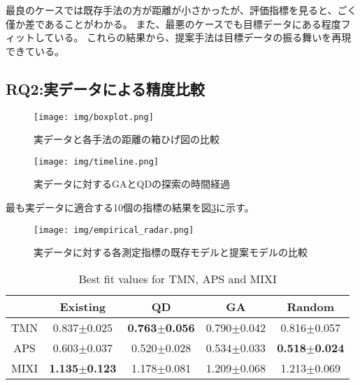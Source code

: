 \documentclass[uplatex,11pt,openany]{ujreport}
\begin{document}
            最良のケースでは既存手法の方が距離が小さかったが、評価指標を見ると、ごく僅か差であることがわかる。
            また、最悪のケースでも目標データにある程度フィットしている。
            これらの結果から、提案手法は目標データの振る舞いを再現できている。


        \subsection{RQ2:実データによる精度比較}

        \begin{figure}[htbp]
            \centering
            \texttt{[image: img/boxplot.png]}
            \caption{実データと各手法の距離の箱ひげ図の比較}
            \label{fig:boxplot}
        \end{figure}

        \begin{figure}[htbp]
            \centering
            \texttt{[image: img/timeline.png]}
            \caption{実データに対するGAとQDの探索の時間経過}
            \label{fig:timeline}
        \end{figure}

        最も実データに適合する10個の指標の結果を図\ref{fig:radar_chart}に示す。
        \begin{figure}[htbp]
            \centering
            \texttt{[image: img/empirical\_radar.png]}
            \caption{実データに対する各測定指標の既存モデルと提案モデルの比較}
            \label{fig:radar_chart}
        \end{figure}

        \begin{table}[htbp]
            \centering
            \caption{Best fit values for TMN, APS and MIXI}
            \label{tab:best_distance}
            \begin{tabular}{ccccc}
            \hline
                 & Existing & QD & GA & Random \\ \hline
            TMN  & 0.837$\pm$0.025     & \textbf{0.763$\pm$0.056}       & 0.790$\pm$0.042       & 0.816$\pm$0.057   \\
            APS  & 0.603$\pm$0.037     & 0.520$\pm$0.028       & 0.534$\pm$0.033       & \textbf{0.518$\pm$0.024}   \\
            MIXI & \textbf{1.135$\pm$0.123}     & 1.178$\pm$0.081       & 1.209$\pm$0.068       & 1.213$\pm$0.069   \\ \hline
            \end{tabular}
        \end{table}
\end{document}
